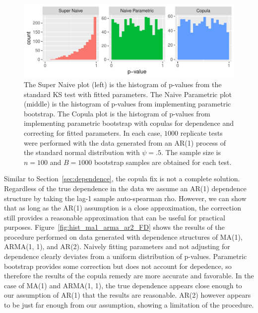 \documentclass[12pt, letterpaper, titlepage]{article}
\begin{document}
\begin{figure}[tbp]
  \centering
  \includegraphics{hist_ar1_FD}
  \caption{The Super Naive plot (left) is the histogram of p-values from the 
  standard KS test with fitted parameters. The Naive Parametric plot (middle) is
  the histogram of p-values from implementing parametric bootstrap. The Copula 
  plot is the histogram of p-values from implementing parametric bootstrap with 
  copulas for dependence and correcting for fitted parameters. In each case, 
  $1000$ replicate tests were performed with the data generated from an AR(1) 
  process of the standard normal distribution with $\psi = .5$. The sample size 
  is $n = 100$ and $B = 1000$ bootstrap samples are obtained for each test.}
  \label{fig:hist_ar1_FD}
\end{figure}

Similar to Section~\ref{sec:dependence}, the copula fix is not a complete 
solution. Regardless of the true dependence in the data we assume an AR(1) 
dependence structure by taking the lag-1 sample auto-spearman rho. However, we 
can show that as long as the AR(1) assumption is a close approximation, the 
correction still provides a reasonable approximation that can be useful for 
practical purposes. Figure~\ref{fig:hist_ma1_arma_ar2_FD} shows the results of the 
procedure performed on data generated with dependence structures of  MA(1), 
ARMA(1, 1), and AR(2). Naively fitting parameters and not adjusting for 
dependence clearly deviates from a uniform distribution of p-values. Parametric 
bootstrap provides some correction but does not account for depedence, so 
therefore the results of the copula remedy are more accurate and favorable.
In the case of MA(1) and ARMA(1, 1), the true dependence appears close enough 
to our assumption of AR(1) that the results are reasonable. AR(2) however
appears to be just far enough from our assumption, showing a limitation of the 
procedure.
\end{document}
